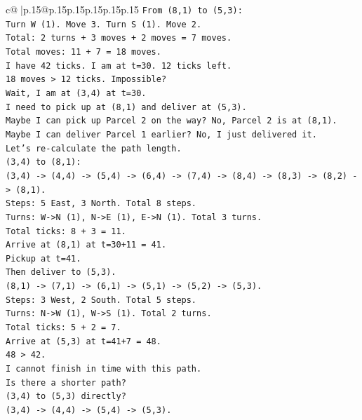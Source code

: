\documentclass{article}
\begin{document}
{\begin{supertabular}{c@{$\;$}|p{.15\linewidth}@{}p{.15\linewidth}p{.15\linewidth}p{.15\linewidth}p{.15\linewidth}p{.15\linewidth}}
{{{\texttt{From (8,1) to (5,3):} \\
\texttt{Turn W (1). Move 3. Turn S (1). Move 2.} \\
\texttt{Total: 2 turns + 3 moves + 2 moves = 7 moves.} \\
\texttt{Total moves: 11 + 7 = 18 moves.} \\
\texttt{I have 42 ticks. I am at t=30. 12 ticks left.} \\
\texttt{18 moves > 12 ticks. Impossible?} \\
\texttt{Wait, I am at (3,4) at t=30.} \\
\texttt{I need to pick up at (8,1) and deliver at (5,3).} \\
\texttt{Maybe I can pick up Parcel 2 on the way? No, Parcel 2 is at (8,1).} \\
\texttt{Maybe I can deliver Parcel 1 earlier? No, I just delivered it.} \\
\texttt{Let's re{-}calculate the path length.} \\
\texttt{(3,4) to (8,1):} \\
\texttt{(3,4) {-}> (4,4) {-}> (5,4) {-}> (6,4) {-}> (7,4) {-}> (8,4) {-}> (8,3) {-}> (8,2) {-}> (8,1).} \\
\texttt{Steps: 5 East, 3 North. Total 8 steps.} \\
\texttt{Turns: W{-}>N (1), N{-}>E (1), E{-}>N (1). Total 3 turns.} \\
\texttt{Total ticks: 8 + 3 = 11.} \\
\texttt{Arrive at (8,1) at t=30+11 = 41.} \\
\texttt{Pickup at t=41.} \\
\texttt{Then deliver to (5,3).} \\
\texttt{(8,1) {-}> (7,1) {-}> (6,1) {-}> (5,1) {-}> (5,2) {-}> (5,3).} \\
\texttt{Steps: 3 West, 2 South. Total 5 steps.} \\
\texttt{Turns: N{-}>W (1), W{-}>S (1). Total 2 turns.} \\
\texttt{Total ticks: 5 + 2 = 7.} \\
\texttt{Arrive at (5,3) at t=41+7 = 48.} \\
\texttt{48 > 42.} \\
\texttt{I cannot finish in time with this path.} \\
\texttt{Is there a shorter path?} \\
\texttt{(3,4) to (5,3) directly?} \\
\texttt{(3,4) {-}> (4,4) {-}> (5,4) {-}> (5,3).} \\
}}}
\end{supertabular}}
\end{document}
